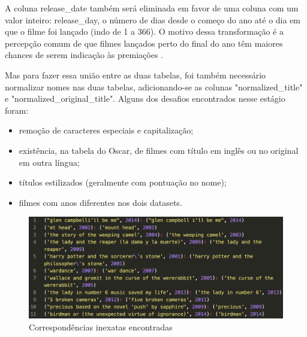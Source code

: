             A coluna release\_date também será eliminada em favor de uma coluna com um valor inteiro: release\_day, o número de dias desde o começo do ano até o dia em que o filme foi lançado (indo de 1 a 366). O motivo dessa transformação é a percepção comum de que filmes lançados perto do final do ano têm maiores chances de serem indicação às premiações \cite{hdsr2020}. 

            Mas para fazer essa união entre as duas tabelas, foi também necessário normalizar nomes nas duas tabelas, adicionando-se as colunas "normalized\_title" e "normalized\_original\_title". Alguns dos desafios encontrados nesse estágio foram:

            \begin{itemize}
                \item remoção de caracteres especiais e capitalização;
                \item existência, na tabela do Oscar, de filmes com título em inglês ou no original em outra língua;
                \item títulos estilizados (geralmente com pontuação no nome);
                \item filmes com anos diferentes nos dois datasets.
            \end{itemize}

            \begin{figure}[htb]
            	\caption{\label{corresp}Correspondências inexatas encontradas}
            	\begin{center}
            		\includegraphics[scale=0.35]{corresp.png}
            	\end{center}
            \end{figure}
            
